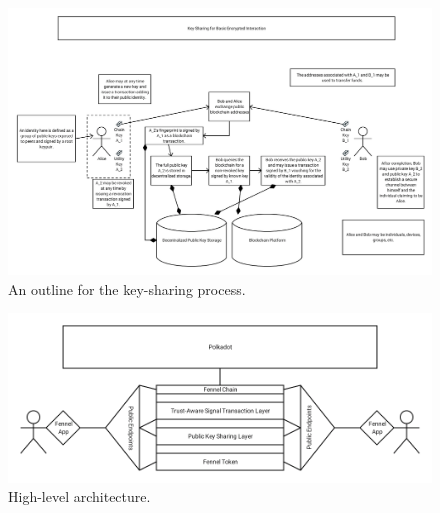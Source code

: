 \documentclass[]{article}
\begin{document}
\pagebreak
\begin{figure}[htbp]
\centering
\includegraphics[width=1.2\columnwidth]{detailed-arch.png}
\caption{An outline for the key-sharing process.}
\label{scrivauto:58}
\end{figure}
\clearpage
\begin{figure}[htbp]
\centering
\includegraphics[width=1.2\columnwidth]{arch-overview.png}
\caption{High-level architecture.}
\label{scrivauto:59}
\end{figure}

\pagebreak
\printbibliography[heading=bibintoc]{}
\end{document}
